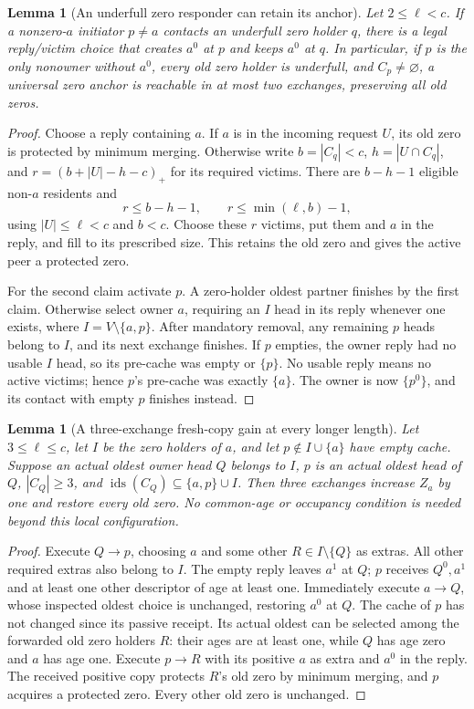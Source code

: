 \documentclass[11pt]{article}
\newtheorem{lemma}[theorem]{Lemma}
\begin{document}
\begin{lemma}[An underfull zero responder can retain its anchor]
\label{lem:underfullzeroreply}
Let $2\le\ell<c$. If a nonzero-$a$ initiator $p\ne a$
contacts an underfull zero holder $q$, there is a legal
reply/victim choice that creates $a^0$ at $p$ and keeps
$a^0$ at $q$. In particular, if $p$ is the only nonowner
without $a^0$, every old zero holder is underfull, and
$C_p\ne\varnothing$, a universal zero anchor is reachable
in at most two exchanges, preserving all old zeros.
\end{lemma}
\begin{proof}
Choose a reply containing $a$. If $a$ is in the incoming
request $U$, its old zero is protected by minimum merging.
Otherwise write $b=|C_q|<c$, $h=|U\cap C_q|$, and
$r=(b+|U|-h-c)_+$ for its required victims.
There are $b-h-1$ eligible non-$a$ residents and
\[
 r\le b-h-1,\qquad r\le\min(\ell,b)-1,
\]
using $|U|\le\ell<c$ and $b<c$.
Choose these $r$ victims, put them and $a$ in the reply,
and fill to its prescribed size. This retains the old
zero and gives the active peer a protected zero.

For the second claim activate $p$. A zero-holder oldest
partner finishes by the first claim. Otherwise select
owner $a$, requiring an $I$ head in its reply whenever
one exists, where $I=V\setminus\{a,p\}$.
After mandatory removal, any remaining $p$ heads belong
to $I$, and its next exchange finishes.
If $p$ empties, the owner reply had no usable $I$ head,
so its pre-cache was empty or $\{p\}$. No usable reply
means no active victims; hence $p$'s pre-cache was
exactly $\{a\}$. The owner is now $\{p^0\}$, and
its contact with empty $p$ finishes instead.
\end{proof}

\begin{lemma}[A three-exchange fresh-copy gain at every longer length]
\label{lem:emptytargetthree}
Let $3\le\ell\le c$, let $I$ be the zero holders of $a$,
and let $p\notin I\cup\{a\}$ have empty cache.
Suppose an actual oldest owner head $Q$ belongs to $I$,
$p$ is an actual oldest head of $Q$, $|C_Q|\ge3$, and
$\operatorname{ids}(C_Q)\subseteq\{a,p\}\cup I$.
Then three exchanges increase $Z_a$ by one and restore
every old zero. No common-age or occupancy condition
is needed beyond this local configuration.
\end{lemma}
\begin{proof}
Execute $Q\to p$, choosing $a$ and some other
$R\in I\setminus\{Q\}$ as extras. All other required
extras also belong to $I$. The empty reply leaves
$a^1$ at $Q$; $p$ receives $Q^0,a^1$ and at least
one other descriptor of age at least one.
Immediately execute $a\to Q$, whose inspected oldest
choice is unchanged, restoring $a^0$ at $Q$.
The cache of $p$ has not changed since its passive receipt.
Its actual oldest can be selected among the forwarded
old zero holders $R$: their ages are at least one,
while $Q$ has age zero and $a$ has age one.
Execute $p\to R$ with its positive $a$ as extra and
$a^0$ in the reply. The received positive copy protects
$R$'s old zero by minimum merging, and $p$ acquires
a protected zero. Every other old zero is unchanged.
\end{proof}
\end{document}
